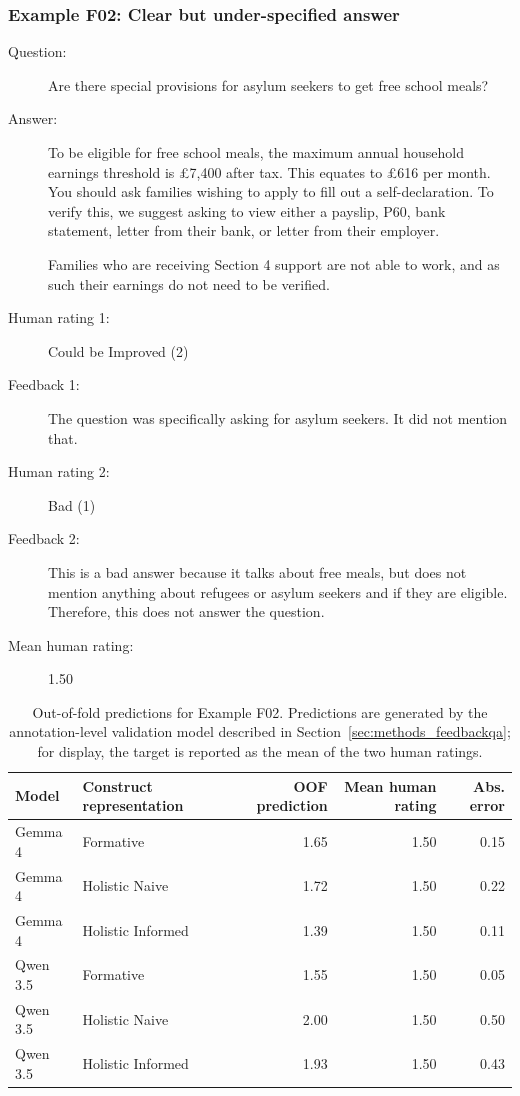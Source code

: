 \subsubsection*{Example F02: Clear but under-specified answer}


\begin{description}
    \item[Question:] Are there special provisions for asylum seekers to get free school meals?

    \item[Answer:] To be eligible for free school meals, the maximum annual household earnings
    threshold is \pounds7,400 after tax. This equates to \pounds616 per month.
    You should ask families wishing to apply to fill out a self-declaration.
    To verify this, we suggest asking to view either a payslip, P60, bank statement,
    letter from their bank, or letter from their employer.

    Families who are receiving Section 4 support are not able to work, and as such
    their earnings do not need to be verified.

    \item[Human rating 1:] Could be Improved (2)

    \item[Feedback 1:] The question was specifically asking for asylum seekers. It did not mention that.

    \item[Human rating 2:] Bad (1)

    \item[Feedback 2:] This is a bad answer because it talks about free meals, but does not mention anything about refugees or asylum seekers and if they are eligible. Therefore, this does not answer the question.

    \item[Mean human rating:] 1.50
\end{description}

\begin{table}[h]
\centering
\small
\caption{Out-of-fold predictions for Example F02. Predictions are generated by the annotation-level validation model described in Section~\ref{sec:methods_feedbackqa}; for display, the target is reported as the mean of the two human ratings.}
\label{tab:feedbackqa_example_f02_oof}
\begin{tabularx}{\textwidth}{@{}l l r r r@{}}
\toprule
\textbf{Model} & \textbf{Construct representation} & \textbf{OOF prediction} & \textbf{Mean human rating} & \textbf{Abs. error} \\
\midrule
Gemma 4 & Formative & 1.65 & 1.50 & 0.15 \\
Gemma 4 & Holistic Naive & 1.72 & 1.50 & 0.22 \\
Gemma 4 & Holistic Informed & 1.39 & 1.50 & 0.11 \\
\addlinespace
Qwen 3.5 & Formative & 1.55 & 1.50 & 0.05 \\
Qwen 3.5 & Holistic Naive & 2.00 & 1.50 & 0.50 \\
Qwen 3.5 & Holistic Informed & 1.93 & 1.50 & 0.43 \\
\bottomrule
\end{tabularx}
\end{table}

